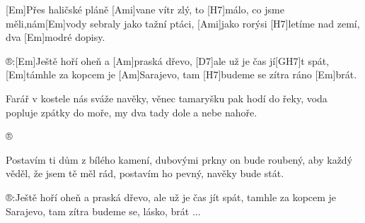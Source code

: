 
[Em]Přes haličské pláně [Ami]vane vítr zlý,
to [H7]málo, co jsme měli,nám[Em]vody sebraly
jako tažní ptáci, [Ami]jako rorýsi
[H7]letíme nad zemí, dva [Em]modré dopisy.

®:[Em]Ještě hoří oheň a [Am]praská dřevo,
[D7]ale už je čas jí[GH7]t spát, [Em]támhle za kopcem je [Am]Sarajevo,
tam [H7]budeme se zítra ráno [Em]brát.

Farář v kostele nás sváže navěky,
věnec tamaryšku pak hodí do řeky,
voda popluje zpátky do moře,
my dva tady dole a nebe nahoře. 

®

Postavím ti dům z bílého kamení,
dubovými prkny on bude roubený,
aby každý věděl, že jsem tě měl rád,
postavím ho pevný, navěky bude stát.

®:Ještě hoří oheň a praská dřevo,
ale už je čas jít spát,
tamhle za kopcem je Sarajevo,
tam zítra budeme se, lásko, brát ...



